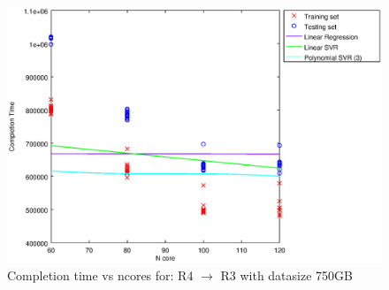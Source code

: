 
\begin {figure}[hbtp]
\centering
\includegraphics[width=\textwidth]{output/R4_R3_750_ALL_FEATURES/plot_R4_R3_750_bestmodels.eps}
\caption{Completion time vs ncores for: R4 $\rightarrow$ R3 with datasize 750GB}
\label{fig:coreonly_linear_R4_R3_750}
\end {figure}
